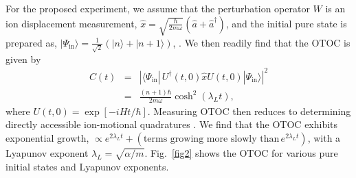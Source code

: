 \documentclass[prl,twocolumn,superscriptaddress,floatfix,showpacs,amsmath,longbibliography,nofootinbib,amssymb]{revtex4-1}
\newcommand{\col}[1]{\textcolor{red}{#1}}
\newcommand{\colb}[1]{\textcolor{blue}{#1}}
\newcommand{\colp}[1]{\textcolor{purple}{#1}}
\begin{document}
For the proposed experiment, we assume that the perturbation operator $W$ is an ion displacement measurement, 
$\hat{x}=\sqrt{\frac{\hbar}{2m\omega}}(\hat{a}+\hat{a}^\dagger)$, %
and
the initial pure state is prepared as, $| \Psi_\text{in}\rangle=\frac{1}{\sqrt{2}}(|n\rangle+|n+1\rangle)$, \cite{PhysRevLett.90.037902, PhysRevLett.92.113004}.
We then readily find that the OTOC is given by 
\begin{eqnarray}\label{OTOCn}
\nonumber
C(t)&=&\left|\langle \Psi_\text{in}|\,U^\dagger(t, 0)\hat{x}U(t, 0)|\Psi_\text{in}\rangle\right|^2
\\&=&
\frac{(n+1)\hbar}{2m\omega}\cosh^2(\lambda_Lt),
\end{eqnarray}
where $U(t, 0)=\exp[-iHt/\hbar]$. Measuring  OTOC then reduces to determining  directly 
accessible ion-motional quadratures  
\cite{ZMD, PhysRevLett.104.100503, PhysRevA.100.062111}. 
We find that
the OTOC exhibits exponential growth, $\propto e^{2\lambda_Lt}+(\text{terms growing more slowly than}\,e^{2\lambda_Lt})$, with a Lyapunov exponent 
$\lambda_L=\sqrt{\alpha/m}$. 
Fig.~\ref{fig2} shows the OTOC for various pure initial states and Lyapunov exponents.  
\end{document}
